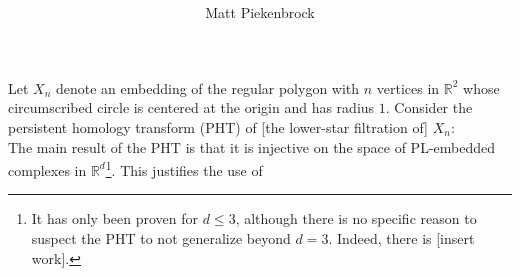 \documentclass[10pt]{article}
\title{\vspace{-2.0em} \vspace{-0.5em}}
\author{Matt Piekenbrock}
\date{}
\begin{document}
 \vspace{-2em} \maketitle \vspace{-1em}
Let $X_n$ denote an embedding of the regular polygon with $n$ vertices in $\mathbb{R}^2$ whose circumscribed circle is centered at the origin and has radius $1$. Consider the persistent homology transform (PHT) of [the lower-star filtration of] $X_n$: 
$$ $$
The main result of the PHT is that it is injective on the space of PL-embedded complexes in $\mathbb{R}^d$\footnote{It has only been proven for $d \leq 3$, although there is no specific reason to suspect the PHT to not generalize beyond $d = 3$. Indeed, there is [insert work].}. This justifies the use of 
\end{document}
